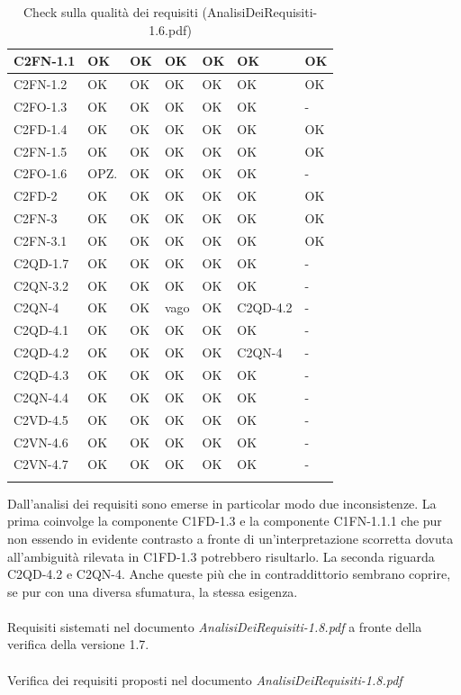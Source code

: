 \begin{footnotesize}
\begin{longtable}{|p{}|p{}|p{}|p{}|p{}|p{}|p{}|}
 C2FN-1.1&  OK&  OK&  OK&  OK&  OK& OK\\ \hline
 C2FN-1.2&  OK&  OK&  OK&  OK&  OK& OK\\ \hline
 C2FO-1.3&  OK&  OK&  OK&  OK&  OK& -\\ \hline
 C2FD-1.4&  OK&  OK&  OK&  OK&  OK& OK\\ \hline
 C2FN-1.5&  OK&  OK&  OK&  OK&  OK& OK\\ \hline
 C2FO-1.6&  OPZ.&  OK&  OK&  OK&  OK& -\\ \hline
 C2FD-2&  OK&  OK&  OK&  OK&  OK& OK\\ \hline
 C2FN-3&  OK&  OK&  OK&  OK&  OK& OK\\ \hline
 C2FN-3.1&  OK&  OK&  OK&  OK&  OK& OK\\ \hline
 C2QD-1.7&  OK&  OK&  OK&  OK&  OK& -\\ \hline
 C2QN-3.2&  OK&  OK&  OK&  OK&  OK& -\\ \hline
 C2QN-4&  OK&  OK&  vago&  OK&  C2QD-4.2& -\\ \hline
 C2QD-4.1&  OK&  OK&  OK&  OK&  OK& -\\ \hline
 C2QD-4.2&  OK&  OK&  OK&  OK&  C2QN-4& -\\ \hline
 C2QD-4.3&  OK&  OK&  OK&  OK&  OK& -\\ \hline
 C2QN-4.4& OK&  OK&  OK&  OK&  OK& -\\ \hline
 C2VD-4.5&  OK&  OK&  OK&  OK&  OK& -\\ \hline
 C2VN-4.6&  OK&  OK&  OK&  OK&  OK& -\\ \hline
 C2VN-4.7&  OK&  OK&  OK&  OK&  OK& -\\ \hline
 
\caption{Check sulla qualit\`a dei requisiti (AnalisiDeiRequisiti-1.6.pdf)}
\end{longtable}
\end{footnotesize}

Dall'analisi dei requisiti sono emerse in particolar modo due inconsistenze. La
prima coinvolge la componente C1FD-1.3 e la componente C1FN-1.1.1 che pur non
essendo in evidente contrasto a fronte di un'interpretazione scorretta dovuta
all'ambiguit\`a rilevata in C1FD-1.3 potrebbero risultarlo.
La seconda riguarda C2QD-4.2 e C2QN-4. Anche queste pi\`u che in contraddittorio
sembrano coprire, se pur con una diversa sfumatura, la stessa esigenza.
\\\\
Requisiti sistemati nel documento \emph{AnalisiDeiRequisiti-1.8.pdf} a fronte
della verifica della versione 1.7.
\\\\
Verifica dei requisiti proposti nel documento \emph{AnalisiDeiRequisiti-1.8.pdf}

